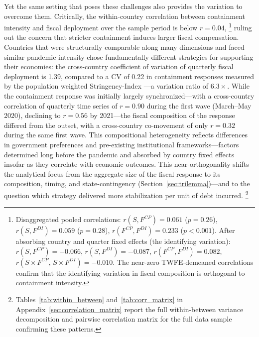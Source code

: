 \documentclass[12pt, a4paper]{article}
\begin{document}
Yet the same setting that poses these challenges also provides the variation to
overcome them. Critically, the within-country correlation between containment
intensity and fiscal deployment over the sample period is below $r = 0.04$,  \footnote{Disaggregated pooled correlations: $r(S, F^{CP}) = 0.061$
($p = 0.26$), $r(S, F^{DI}) = 0.059$ ($p = 0.28$),
$r(F^{CP}, F^{DI}) = 0.233$ ($p < 0.001$). After absorbing country and
quarter fixed effects (the identifying variation): $r(S, F^{CP}) = -0.066$,
$r(S, F^{DI}) = -0.087$, $r(F^{CP}, F^{DI}) = 0.082$,
$r(S \times F^{CP},\, S \times F^{DI}) = -0.010$. The near-zero
TWFE-demeaned correlations confirm that the identifying variation in
fiscal composition is orthogonal to containment intensity.} ruling out
the concern that stricter containment induces larger fiscal compensation. Countries that were structurally comparable along many dimensions and faced similar pandemic intensity chose fundamentally different strategies for supporting their economies: the cross-country coefficient of variation of quarterly fiscal deployment is 1.39, compared to a CV of 0.22 in containment responses measured by the population weighted Stringency-Index \citep{Hale2021}---a variation ratio of $6.3\times$. While the containment response was initially largely synchronized---with a cross-country correlation of quarterly time series of $r = 0.90$ during the first wave (March--May 2020), declining to $r = 0.56$ by 2021---the fiscal composition of the response differed from the outset, with a cross-country co-movement of only $r = 0.32$ during the same first wave.  This compositional heterogeneity reflects differences in government preferences and pre-existing institutional frameworks---factors determined long before the pandemic and absorbed by country fixed effects insofar as they correlate with economic outcomes. This near-orthogonality shifts the analytical focus from the aggregate size of the fiscal response to its composition, timing, and
state-contingency (Section~\ref{sec:trilemma})---and to the question which
strategy delivered more stabilization per unit of debt incurred. \footnote{Tables~\ref{tab:within_between} and~\ref{tab:corr_matrix} in Appendix~\ref{sec:correlation_matrix} report the full within-between variance decomposition and pairwise correlation matrix for the full data sample confirming these patterns.}

\end{document}
